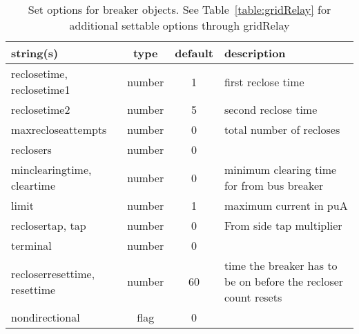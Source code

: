 \begin{table}[ht]
\centering
\begin{tabular}{p{5cm} c c p{7cm}}
\hline
string(s) & type & default & description \\
\hline
reclosetime, reclosetime1 & number & 1 & first reclose time\\
reclosetime2 & number & 5 & second reclose time\\
maxrecloseattempts & number & 0 & total number of recloses\\
reclosers & number & 0 & \\
minclearingtime, cleartime & number & 0 & minimum clearing time for from bus breaker\\
limit & number & 1 & maximum current in puA\\
reclosertap, tap & number & 0 & From side tap multiplier\\
terminal & number & 0 & \\
recloserresettime, resettime & number & 60 & time the breaker has to be on before the recloser count resets\\
nondirectional & flag & 0 & \\
\hline
\end{tabular}
\caption{Set options for breaker objects. See Table~\ref{table:gridRelay} for additional settable options through gridRelay}
\label{table:breaker}
\end{table}
